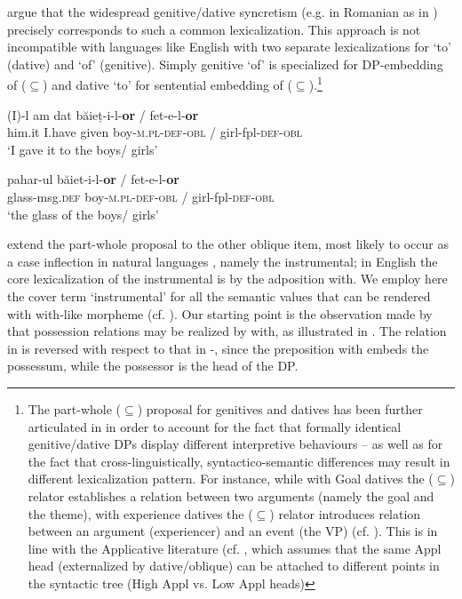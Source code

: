 \documentclass[output=paper,modfonts,nonflat,newtxmath,colorlinks,citecolor=brown]{langsci/langscibook}
\begin{document}
\citet{ManziniSavoia2011} argue that the widespread genitive/dative syncretism (e.g. in Romanian as in ) precisely corresponds to such a common lexicalization. This approach is not incompatible with languages like English with two separate lexicalizations for ‘to’ (dative) and ‘of’ (genitive). Simply genitive ‘of’ is specialized for DP-embedding of (${\subseteq}$) and dative ‘to’ for sentential embedding of (${\subseteq}$).\footnote{The part-whole (\textrm{${\subseteq}$}) proposal for genitives and datives has been further articulated in \citet{ManziniFranco2016, FrancoManzini2017Gen} in order to account for the fact that formally identical genitive/dative DPs display different interpretive behaviours – as well as for the fact that cross-linguistically, syntactico-semantic differences may result in different lexicalization pattern. For instance, while with Goal datives the (\textrm{${\subseteq}$}) relator establishes a relation between two arguments (namely the goal and the theme), with experience datives the (\textrm{${\subseteq}$}) relator introduces relation between an argument (experiencer) and an event (the VP) (cf. \citealt[230-231]{ManziniFranco2016}). This is in line with the Applicative literature (cf. \citep{Pylkkänen2008}, which assumes that the same Appl head (externalized by dative/oblique) can be attached to different points in the syntactic tree (High Appl {vs}. Low Appl heads)} 

\ea%
    \label{ex:franco:3}
    \ea
    \gll (I)-l am dat băieț-i-l-\textbf{or} / fet-e-l-\textbf{or} \\
        him.it I.have given boy-\textsc{m.pl}-\textsc{def}-\textsc{obl} / girl-fpl-\textsc{def}-\textsc{obl}\\
    \glt ‘I gave it to the boys/ girls’
    
     \ex
    \gll pahar-ul băiet-i-l-\textbf{or} / fet-e-l-\textbf{or} \\
        glass-msg.\textsc{def} boy-\textsc{m.pl}-\textsc{def}-\textsc{obl} / girl-fpl-\textsc{def}-\textsc{obl}\\
    \glt ‘the glass of the boys/ girls’ 
    \z
    \z


\citet{FrancoManzini2017Ins} extend the part-whole proposal to the other oblique item, most likely to occur as a case inflection in natural languages \citep{Caha2009}, namely the instrumental; in English the core lexicalization of the instrumental is by the adposition {with.} We employ here the cover term ‘instrumental’ for all the semantic values that can be rendered with {with-}like morpheme (cf. \citealt{StolzStrohUrdze2006}). Our starting point is the observation made by \citet{Levinson2011} that possession relations may be realized by {with}, as illustrated in . The relation in  is reversed with respect to that in -, since the preposition {with} embeds the {possessum}, while the {possessor} is the head of the DP.
\end{document}
